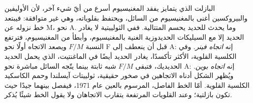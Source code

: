 البازلت الذي يتمايز يفقد المغنيسيوم أسرع من أيّ شيء آخر، لأن الأوليفين
والبيروكسين أغنى بالمغنيسيوم من السائل، ويحتفظ بقلوياته، وهي
غير متوافقة: فيبتعد خط نزوله عن M، نحو A. وما يحدث
للحديد يحسم المتتالية. ففي  الثولييتية لا يغادر الحديد إلا مع
السيليكات الحديدوزية الغنية بالمغنيسيوم، وأبطأ من المغنيسيوم، فترتفع النسبة
$F/M$ ويصعد الاتجاه أولًا نحو F قبل أن ينعطف إلى A: إنه
\emph{اتجاه فينر}. وفي  الكلسية القلوية، الأكثر تأكسدًا، يغادر الحديد أيضًا في
الماغنتيت، الذي يحمل الحديد الحديديك، فتبقى $F/M$ شبه ثابتة بينما
يتّجه السائل مباشرة نحو A: إنه \emph{اتجاه بوين}. ويُظهر الشكل أدناه الاتجاهين في
صخور حقيقية، ثولييتات آيسلندا وحمم الكاسكيد الكلسية القلوية. أمّا
الخط الفاصل، المرسوم بالعين عام 1971، فيفصل بينهما جيدًا حيث تكون بازلتية؛ وعند
القلويات المرتفعة يتقارب الاتجاهان ولا يقول الخط شيئًا يُذكر.

